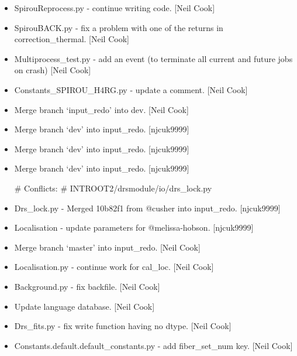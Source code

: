 \documentclass[a4paper,10pt,english]{report}
\begin{document}
\label{\detokenize{misc/changelog:id120}}\begin{itemize}
\item {} 
SpirouReprocess.py - continue writing code. {[}Neil Cook{]}

\item {} 
SpirouBACK.py - fix a problem with one of the returns in
correction\_thermal. {[}Neil Cook{]}

\item {} 
Multiprocess\_test.py - add an event (to terminate all current and
future jobs on crash) {[}Neil Cook{]}

\item {} 
Constants\_SPIROU\_H4RG.py - update a comment. {[}Neil Cook{]}

\item {} 
Merge branch ‘input\_redo’ into dev. {[}Neil Cook{]}

\item {} 
Merge branch ‘dev’ into input\_redo. {[}njcuk9999{]}

\item {} 
Merge branch ‘dev’ into input\_redo. {[}njcuk9999{]}

\item {} 
Merge branch ‘dev’ into input\_redo. {[}njcuk9999{]}

\# Conflicts:
\#     INTROOT2/drsmodule/io/drs\_lock.py

\item {} 
Drs\_lock.py - Merged 10b82f1 from @cusher into input\_redo. {[}njcuk9999{]}

\item {} 
Localisation - update parameters for @melissa-hobson. {[}njcuk9999{]}

\item {} 
Merge branch ‘master’ into input\_redo. {[}Neil Cook{]}

\item {} 
Localisation.py - continue work for cal\_loc. {[}Neil Cook{]}

\item {} 
Background.py - fix backfile. {[}Neil Cook{]}

\item {} 
Update language database. {[}Neil Cook{]}

\item {} 
Drs\_fits.py - fix write function having no dtype. {[}Neil Cook{]}

\item {} 
Constants.default.default\_constants.py - add fiber\_set\_num key. {[}Neil
Cook{]}


\end{itemize}
\end{document}
